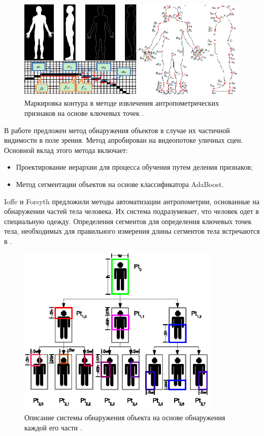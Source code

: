 \begin{figure}[ht!]
\centering
\includegraphics [scale=0.8] {images/h2.png}
\begin{center}
\caption{Маркировка контура в методе извлечения антропометрических признаков на основе ключевых точек \cite{Lin2008}.} \label{img2}
\end{center}
\end{figure}

В работе \cite{Nevatia2009} предложен метод обнаружения объектов в случае их частичной видимости в поле зрения. Метод апробирован на видеопотоке уличных сцен. Основной вклад этого метода включает:

\begin{itemize}
	\item Проектирование иерархии для процесса обучения путем деления признаков;
	\item Метод сегментации объектов на основе  классификатора AdaBoost.
\end{itemize}

Ioffe и Forsyth \cite{Ioffe2001} предложили методы автоматизации антропометрии, основанные на обнаружении частей тела человека. Их система подразумевает, что человек одет в специальную одежду. Определения сегментов для определения ключевых точек тела, необходимых для правильного измерения длины сегментов тела встречаются в \cite{Leva1996}. 

\begin{figure}[ht!]
\centering
\includegraphics [scale=0.8] {images/h3.png}
\begin{center}
\caption{Описание системы обнаружения объекта на основе обнаружения каждой его части \cite{Nevatia2009}.} \label{img3}
\end{center}
\end{figure}

